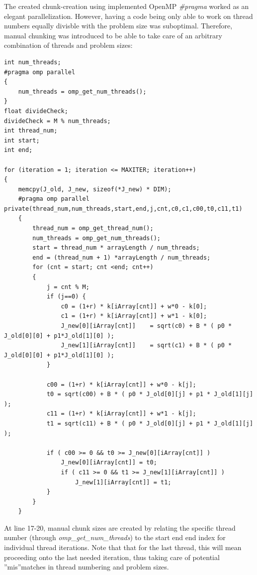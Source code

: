 \documentclass[12pt]{article}
\begin{document}
The created chunk-creation using implemented OpenMP \emph{\color{Plum} \#pragma} worked as an elegant parallelization. However, having a code being only able to work on thread numbers equally divisble with the problem size was suboptimal. Therefore, manual chunking was introduced to be able to take care of an arbitrary combination of threads and problem sizes:


\begin{lstlisting}[caption={Manual OpenMP chunk creation}, label={lst:L5}]
int num_threads;
#pragma omp parallel
{
    num_threads = omp_get_num_threads();
}
float divideCheck;
divideCheck = M % num_threads;
int thread_num;
int start;
int end;
 
for (iteration = 1; iteration <= MAXITER; iteration++)
{
	memcpy(J_old, J_new, sizeof(*J_new) * DIM);
    #pragma omp parallel private(thread_num,num_threads,start,end,j,cnt,c0,c1,c00,t0,c11,t1) 
    {
    	thread_num = omp_get_thread_num();
        num_threads = omp_get_num_threads();
        start = thread_num * arrayLength / num_threads;
        end = (thread_num + 1) *arrayLength / num_threads; 
        for (cnt = start; cnt <end; cnt++)
        {
        	j = cnt % M; 
            if (j==0) {
            	c0 = (1+r) * k[iArray[cnt]] + w*0 - k[0];
                c1 = (1+r) * k[iArray[cnt]] + w*1 - k[0];
                J_new[0][iArray[cnt]]    = sqrt(c0) + B * ( p0 * J_old[0][0] + p1*J_old[1][0] );            
                J_new[1][iArray[cnt]]    = sqrt(c1) + B * ( p0 * J_old[0][0] + p1*J_old[1][0] );
			}
                 
            c00 = (1+r) * k[iArray[cnt]] + w*0 - k[j];
            t0 = sqrt(c00) + B * ( p0 * J_old[0][j] + p1 * J_old[1][j] );
            c11 = (1+r) * k[iArray[cnt]] + w*1 - k[j];
            t1 = sqrt(c11) + B * ( p0 * J_old[0][j] + p1 * J_old[1][j] );
     
            if ( c00 >= 0 && t0 >= J_new[0][iArray[cnt]] )
            	J_new[0][iArray[cnt]] = t0;
                if ( c11 >= 0 && t1 >= J_new[1][iArray[cnt]] )
                	J_new[1][iArray[cnt]] = t1;
            }
        }
    }
\end{lstlisting}
At line 17-20, manual chunk sizes are created by relating the specific thread number (through \emph{omp\_get\_num\_threads}) to the start end end index for individual thread iterations. Note that that for the last thread, this will mean proceeding onto the last needed iteration, thus taking care of potential ''mis''matches in thread numbering and problem sizes. 
\end{document}
